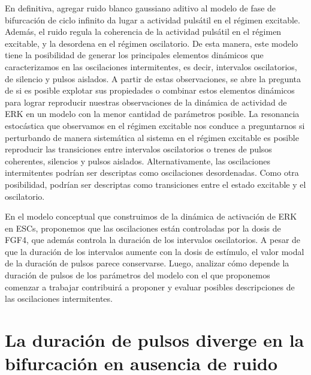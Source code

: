 \documentclass[./main.tex]{subfiles}
\begin{document}
En definitiva, agregar ruido blanco gaussiano aditivo al modelo de fase de bifurcación de ciclo infinito da lugar a actividad pulsátil en el régimen excitable. Además, el ruido regula la coherencia de la actividad pulsátil en el régimen excitable, y la desordena en el régimen oscilatorio. De esta manera, este modelo tiene la posibilidad de generar los principales elementos dinámicos que caracterizamos en las oscilaciones intermitentes, es decir, intervalos oscilatorios, de silencio y pulsos aislados. A partir de estas observaciones, se abre la pregunta de si es posible explotar sus propiedades o combinar estos elementos dinámicos para lograr reproducir nuestras observaciones de la dinámica de actividad de ERK en un modelo con la menor cantidad de parámetros posible. La resonancia estocástica que observamos en el régimen excitable nos conduce a preguntarnos si perturbando de manera sistemática al sistema en el régimen excitable es posible reproducir las transiciones entre intervalos oscilatorios o trenes de pulsos coherentes, silencios y pulsos aislados. Alternativamente, las oscilaciones intermitentes podrían ser descriptas como oscilaciones desordenadas. Como otra posibilidad, podrían ser descriptas como transiciones entre el estado excitable y el oscilatorio. 


En el modelo conceptual que construimos de la dinámica de activación de ERK en ESCs, proponemos que las oscilaciones están controladas por la dosis de FGF4, que además controla la duración de los intervalos oscilatorios. A pesar de que la duración de los intervalos aumente con la dosis de estímulo, el valor modal de la duración de pulsos parece conservarse. Luego, analizar cómo depende la duración de pulsos de los parámetros del modelo con el que proponemos comenzar a trabajar contribuirá a proponer y evaluar posibles descripciones de las oscilaciones intermitentes.


\section{La duración de pulsos diverge en la bifurcación en ausencia de ruido}
\end{document}

